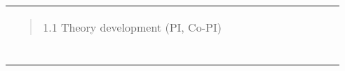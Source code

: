 \begin{longtable}[]{@{}lllllllllll@{}}
\begin{minipage}[t]{0.07\columnwidth}
\begin{quote}
1.1 Theory development (PI, Co-PI) \end{quote}\strut \end{minipage} & \begin{minipage}[t]{0.07\columnwidth}\raggedright \strut \end{minipage} & \begin{minipage}[t]{0.07\columnwidth}\raggedright \strut \end{minipage} & \begin{minipage}[t]{0.07\columnwidth}\raggedright \strut \end{minipage} & \begin{minipage}[t]{0.07\columnwidth}\raggedright \strut \end{minipage} & \begin{minipage}[t]{0.07\columnwidth}\raggedright \strut \end{minipage} & \begin{minipage}[t]{0.07\columnwidth}\raggedright \strut \end{minipage} & \begin{minipage}[t]{0.07\columnwidth}\raggedright \strut \end{minipage} & \begin{minipage}[t]{0.07\columnwidth}\raggedright \strut \end{minipage} & \begin{minipage}[t]{0.07\columnwidth}\raggedright \strut \end{minipage} & \begin{minipage}[t]{0.07\columnwidth}\raggedright \strut \end{minipage}\tabularnewline \begin{minipage}[t]{0.07\columnwidth}\raggedright \begin{quote}

\end{quote}
\end{minipage}
\end{longtable}
